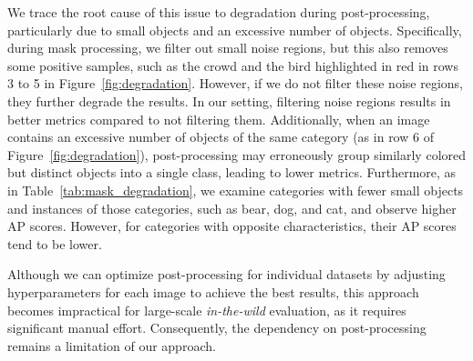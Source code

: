We trace the root cause of this issue to degradation during post-processing, particularly due to small objects and an excessive number of objects. Specifically, during mask processing, we filter out small noise regions, but this also removes some positive samples, such as the crowd and the bird highlighted in red in rows 3 to 5 in Figure~\ref{fig:degradation}. However, if we do not filter these noise regions, they further degrade the results.
In our setting, filtering noise regions results in better metrics compared to not filtering them. Additionally, when an image contains an excessive number of objects of the same category (as in row 6 of Figure~\ref{fig:degradation}), post-processing may erroneously group similarly colored but distinct objects into a single class, leading to lower metrics. 
Furthermore, as in Table~\ref{tab:mask_degradation}, we examine categories with fewer small objects and instances of those categories, such as bear, dog, and cat, and observe higher AP scores. However, for categories with opposite characteristics, their AP scores tend to be lower.

Although we can optimize post-processing for individual 
datasets 
by adjusting hyperparameters for each image to achieve the best results, this approach becomes impractical for large-scale \textit{in-the-wild} evaluation, as it requires significant manual effort. Consequently, the dependency on post-processing remains a limitation of our approach.